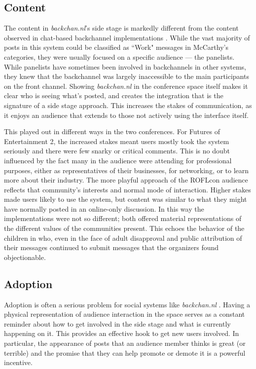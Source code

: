 \subsection{Content}
The content in \emph{backchan.nl}'s side stage is markedly different from the content observed in chat-based backchannel implementations \citep{Yardi:2006uk,Cogdill:2001fp,Golub:2005ws,Rekimoto:1998jy}. While the vast majority of posts in this system could be classified as ``Work" messages in McCarthy's categories, they were usually focused on a specific audience --- the panelists. While panelists have sometimes been involved in backchannels in other systems, they knew that the backchannel was largely inaccessible to the main participants on the front channel. Showing \emph{backchan.nl} in the conference space itself makes it clear who is seeing what's posted, and creates the integration that is the signature of a side stage approach. This increases the stakes of communication, as it enjoys an audience that extends to those not actively using the interface itself.

This played out in different ways in the two conferences. For Futures of Entertainment 2, the increased stakes meant users mostly took the system seriously and there were few snarky or critical comments. This is no doubt influenced by the fact many in the audience were attending for professional purposes, either as representatives of their businesses, for networking, or to learn more about their industry. The more playful approach of the ROFLcon audience reflects that community's interests and normal mode of interaction. Higher stakes made users likely to use the system, but content was similar to what they might have normally posted in an online-only discussion. In this way the implementations were not so different; both offered material representations of the different values of the communities present. This echoes the behavior of the children in \citep{Chesnais:uh} who, even in the face of adult disapproval and public attribution of their messages continued to submit messages that the organizers found objectionable. 

\subsection{Adoption}

Adoption is often a serious problem for social systems like \emph{backchan.nl} \citep{Orlikowski:1992tza}. Having a physical representation of audience interaction in the space serves as a constant reminder about how to get involved in the side stage and what is currently happening on it. This provides an effective hook to get new users involved. In particular, the appearance of posts that an audience member thinks is great (or terrible) and the promise that they can help promote or demote it is a powerful incentive. 

